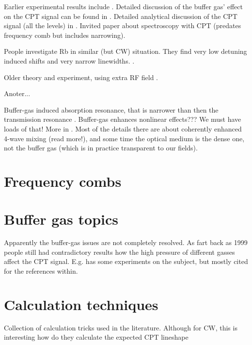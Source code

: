 \documentclass[10pt,a4paper]{report}
\begin{document}
Earlier experimental results include \cite{Brandt1997}.
Detailed discussion of the buffer gas' effect on the CPT signal can be found in \cite{Erhard2001}.
Detailed analytical discussion of the CPT signal (all the levels) in \cite{Taichenachev2003}.
Invited paper about spectroscopy with CPT \cite{Taichenachev2003} (predates frequency comb but includes narrowing).

People investigate Rb in similar (but CW) situation. They find very low detuning induced shifts and very narrow linewidths. \cite{Erhard2000}.

Older theory and experiment, using extra RF field \cite{Vanier1998}.

Anoter... \cite{Vanier1998}

Buffer-gas induced absorption resonance, that is narrower than then the transmission resonance \cite{Mikhailov2004}. Buffer-gas enhances nonlinear effects??? We must have loads of that! More in \cite{Mikhailov2004,Lukin1997,Harris1999,Johnsson2002}. Most of the details there are about coherently enhanced 4-wave mixing (read more!), and some time the optical medium is the dense one, not the buffer gas (which is in practice transparent to our fields).

\section{Frequency combs}

\section{Buffer gas topics}

Apparently the buffer-gas issues are not completely resolved. As fart back as 1999 people still had contradictory results how the high pressure of different gasses affect the CPT signal. E.g. \cite{Gozzini1999} has some experiments on the subject, but mostly cited for the references within.

\section{Calculation techniques}

Collection of calculation tricks used in the literature.
Although for CW, this is interesting how do they calculate the expected CPT lineshape \cite{Novikova2005}




\end{document}
